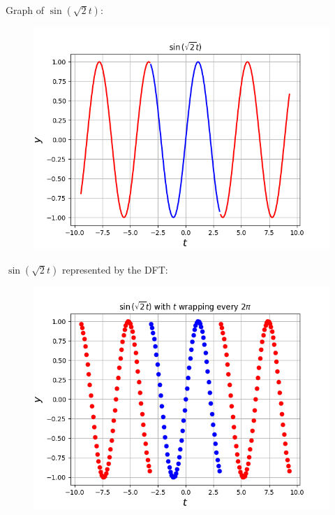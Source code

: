 \documentclass[12pt, a4paper]{article}
\begin{document}
Graph of $\sin(\sqrt{2}t)$:
\begin{figure}[H]
    \centering
    \includegraphics[scale=0.7]{eg2.png}
\end{figure}

$\sin(\sqrt{2}t)$ represented by the DFT:
\begin{figure}[H]
    \centering
    \includegraphics[scale=0.7]{eg3.png}
\end{figure}
\pagebreak
\end{document}
